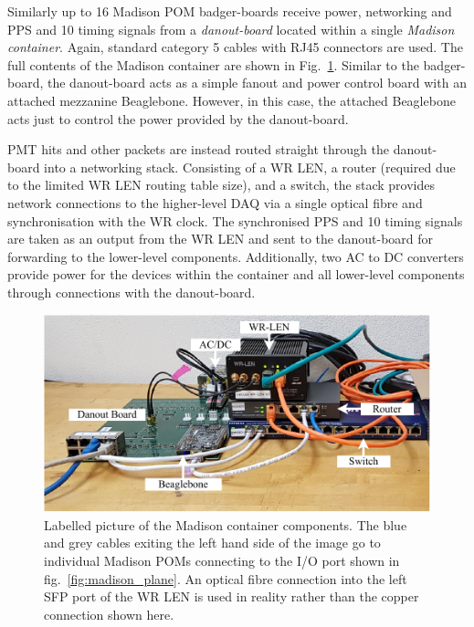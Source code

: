 Similarly up to 16 Madison POM badger-boards receive power, networking and PPS and
\unit{10}{} timing signals from a \emph{danout-board} located within a single
\emph{Madison container}. Again, standard category 5 cables with RJ45 connectors are used. The
full contents of the Madison container are shown in Fig.~\ref{fig:madison_box}. Similar to the
badger-board, the danout-board acts as a simple fanout and power control board with an attached
mezzanine Beaglebone. However, in this case, the attached Beaglebone acts just to control the
power provided by the danout-board.

PMT hits and other packets are instead routed straight through the danout-board into a networking
stack. Consisting of a WR LEN, a router (required due to the limited WR LEN routing table size),
and a switch, the stack provides network connections to the higher-level DAQ via a single optical
fibre and synchronisation with the WR clock. The synchronised PPS and \unit{10}{}
timing signals are taken as an output from the WR LEN and sent to the danout-board for forwarding
to the lower-level components. Additionally, two AC to DC converters provide power for the devices
within the container and all lower-level components through connections with the danout-board.

\begin{figure} %
    \includegraphics[width=\textwidth]{diagrams/5-daq/madison_box.pdf}
    \caption[Labelled picture of the Madison container components.]
    {Labelled picture of the Madison container components. The blue and grey cables exiting the
        left hand side of the image go to individual Madison POMs connecting to the I/O port shown
        in fig.~\ref{fig:madison_plane}. An optical fibre connection into the left SFP port of the
        WR LEN is used in reality rather than the copper connection shown here.}
    \label{fig:madison_box}
\end{figure}

